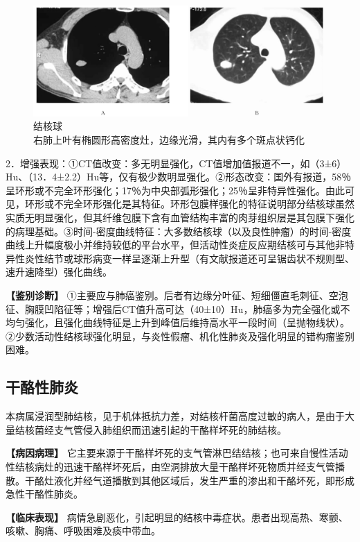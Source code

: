 \begin{figure}[!htbp]
 \centering
 \includegraphics[width=.7\textwidth,height=\textheight,keepaspectratio]{./images/Image00212.jpg}
 \captionsetup{justification=centering}
 \caption{结核球\\{\small 右肺上叶有椭圆形高密度灶，边缘光滑，其内有多个斑点状钙化}}
 \label{fig9-24}
  \end{figure} 

2．增强表现：①CT值改变：多无明显强化，CT值增加值报道不一，如（3±6）Hu、（13．4±2.2）Hu等，仅有极少数明显强化。②形态改变：国外有报道，58％呈环形或不完全环形强化；17％为中央部弧形强化；25％呈非特异性强化。由此可见，环形或不完全环形强化是其特征。环形包膜样强化的特征说明部分结核球虽然实质无明显强化，但其纤维包膜下含有血管结构丰富的肉芽组织层是其包膜下强化的病理基础。③时间-密度曲线特征：大多数结核球（以及良性肿瘤）的时间-密度曲线上升幅度极小并维持较低的平台水平，但活动性炎症反应期结核可与其他非特异性炎性结节或球形病变一样呈逐渐上升型（有文献报道还可呈锯齿状不规则型、速升速降型）强化曲线。

\textbf{【鉴别诊断】}
①主要应与肺癌鉴别。后者有边缘分叶征、短细僵直毛刺征、空泡征、胸膜凹陷征等；增强后CT值升高可达（40±10）Hu，肺癌多为完全强化或不均匀强化，且强化曲线特征是上升到峰值后维持高水平一段时间（呈抛物线状）。②少数活动性结核球强化明显，与炎性假瘤、机化性肺炎及强化明显的错构瘤鉴别困难。

\subsection{干酪性肺炎}

本病属浸润型肺结核，见于机体抵抗力差，对结核杆菌高度过敏的病人，是由于大量结核菌经支气管侵入肺组织而迅速引起的干酪样坏死的肺结核。

\textbf{【病因病理】}
它主要来源于干酪样坏死的支气管淋巴结结核；也可来自慢性活动性结核病灶的迅速干酪样坏死后，由空洞排放大量干酪样坏死物质并经支气管播散。干酪灶液化并经气道播散到其他区域后，发生严重的渗出和干酪坏死，即形成急性干酪性肺炎。

\textbf{【临床表现】}
病情急剧恶化，引起明显的结核中毒症状。患者出现高热、寒颤、咳嗽、胸痛、呼吸困难及痰中带血。

